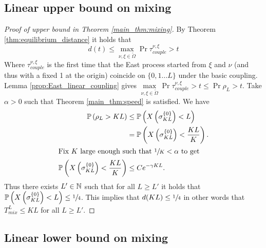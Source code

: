 \subsection{Linear upper bound on mixing}

\begin{proof}[Proof of upper bound in Theorem \ref{main_thm:mixing}]
By Theorem \ref{thm:equilibrium_distance} it holds that 
\begin{equation}\nonumber
d(t) \leq \max\limits_{\nu, \xi \in \widetilde{\Omega}} \Pr{ \tau^{\nu, \xi}_{couple} > t }
\end{equation}
Where $\tau^{\nu, \xi}_{couple}$ is the first time that the East process started from $\xi$ and $\nu$ (and thus with a fixed 1 at the origin) coincide on $\{0, 1 ... L\}$ under the basic coupling. Lemma \ref{prop:East_linear_coupling} gives $\max\limits_{\nu, \xi \in \widetilde{\Omega}} \Pr{\tau^{\nu, \xi}_{couple} > t } \leq \Pr{\rho_L > t}$. Take $\alpha > 0$ such that Theorem \ref{main_thm:speed} is satisfied. We have
\begin{align*}
\mathbb{P} \left( \rho_L > KL \right) &\leq \mathbb{P} \left( X\left(\sigma^{\{0\}}_{KL}\right) < L \right) \\
                 &= \mathbb{P} \left( X\left(\sigma^{\{0\}}_{KL}\right) < \frac{KL}{K} \right). \\
  \intertext{Fix $K$ large enough such that $\sfrac{1}{K} < \alpha$ to get}
                \mathbb{P} \left( X\left(\sigma^{\{0\}}_{KL}\right) < \frac{KL}{K} \right) &\leq C e^{-\gamma K L}. 
\end{align*}
Thus there exists $L' \in \mathbb{N}$ such that for all $L \geq L'$ it holds that $\mathbb{P} \left( X\left(\sigma^{\{0\}}_{KL} \right) < L \right) \leq \sfrac{1}{4}$. This implies that $d(KL) \leq \sfrac{1}{4}$ in other words that $T^L_{mix} \leq KL$ for all $L \geq L'$. 
\end{proof}

\subsection{Linear lower bound on mixing}

